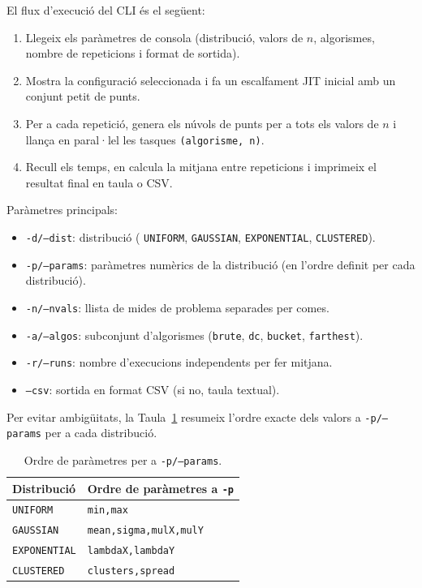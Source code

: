 \documentclass[conference,compsoc]{IEEEtran}
\begin{document}
El flux d'execució del CLI és el següent:
\begin{enumerate}
    \item Llegeix els paràmetres de consola (distribució, valors de $n$,
          algorismes, nombre de repeticions i format de sortida).
    \item Mostra la configuració seleccionada i fa un escalfament JIT
          inicial amb un conjunt petit de punts.
    \item Per a cada repetició, genera els núvols de punts per a tots els
          valors de $n$ i llança en paral·lel les tasques
          \texttt{(algorisme, n)}.
    \item Recull els temps, en calcula la mitjana entre repeticions i
          imprimeix el resultat final en taula o CSV.
\end{enumerate}

Paràmetres principals:
\begin{itemize}
    \item \texttt{-d/--dist}: distribució (
          \texttt{UNIFORM}, \texttt{GAUSSIAN}, \texttt{EXPONENTIAL}, \texttt{CLUSTERED}).
    \item \texttt{-p/--params}: paràmetres numèrics de la distribució
          (en l'ordre definit per cada distribució).
    \item \texttt{-n/--nvals}: llista de mides de problema separades per comes.
    \item \texttt{-a/--algos}: subconjunt d'algorismes
          (\texttt{brute}, \texttt{dc}, \texttt{bucket}, \texttt{farthest}).
    \item \texttt{-r/--runs}: nombre d'execucions independents per fer mitjana.
    \item \texttt{--csv}: sortida en format CSV (si no, taula textual).
\end{itemize}

Per evitar ambigüitats, la Taula~\ref{tab:cli_param_order} resumeix
l'ordre exacte dels valors a \texttt{-p/--params} per a cada distribució.

\begin{table}[H]
    \caption{Ordre de paràmetres per a \texttt{-p/--params}.\label{tab:cli_param_order}}
    \centering
    \scriptsize
    \begin{tabular}{ll}
        \toprule
        Distribució & Ordre de paràmetres a \texttt{-p} \\
        \midrule
        \texttt{UNIFORM} & \texttt{min,max} \\
        \texttt{GAUSSIAN} & \texttt{mean,sigma,mulX,mulY} \\
        \texttt{EXPONENTIAL} & \texttt{lambdaX,lambdaY} \\
        \texttt{CLUSTERED} & \texttt{clusters,spread} \\
        \bottomrule
    \end{tabular}
\end{table}
\end{document}
